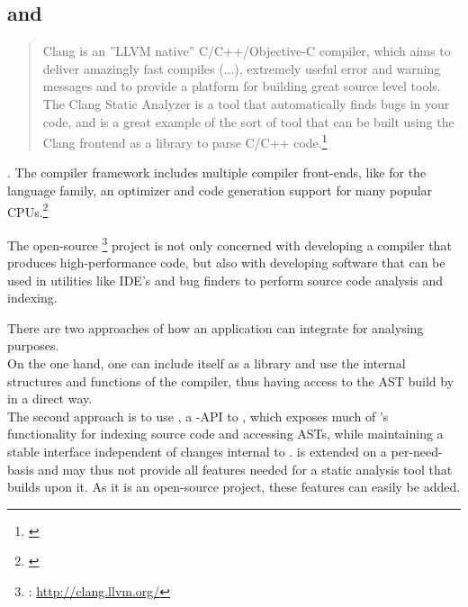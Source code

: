 \subsection{ and }
\label{sec:Clang}

\begin{quotation}
Clang is an ''LLVM native'' C/C++/Objective-C compiler, which aims to deliver amazingly fast compiles (...), extremely useful error and warning messages and to provide a platform for building great source level tools. The Clang Static Analyzer is a tool that automatically finds bugs in your code, and is a great example of the sort of tool that can be built using the Clang frontend as a library to parse C/C++ code.\footnote{\citep{LLVMHP}}
\end{quotation}

. The  compiler framework includes multiple compiler front-ends, like  for the  language family, an optimizer and code generation support for many popular CPUs.\footnote{\citep{LLVMHP}}

The open-source \footnote{: \url{http://clang.llvm.org/}} project is not only concerned with developing a compiler that produces high-performance code, but also with developing software that can be used in utilities like IDE's and bug finders to perform source code analysis and indexing.

There are two approaches of how an application can integrate  for analysing purposes.
\\On the one hand, one can include  itself as a library and use the internal structures and functions of the compiler, thus having access to the AST build by  in a direct way.
\\The second approach is to use , a -API to , which exposes much of 's functionality for indexing source code and accessing ASTs, while maintaining a stable interface independent of changes internal to .  is extended on a per-need-basis and may thus not provide all features needed for a static analysis tool that builds upon it. As it is an open-source project, these features can easily be added.

